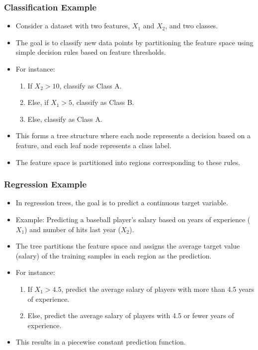 \documentclass{article}
\begin{document}
\subsubsection{Classification Example}

\begin{itemize}
    \item Consider a dataset with two features, $X_1$ and $X_2$, and two classes.
    \item The goal is to classify new data points by partitioning the feature space using simple decision rules based on feature thresholds.
    \item For instance:
    \begin{enumerate}
        \item If $X_2 > 10$, classify as Class A.
        \item Else, if $X_1 > 5$, classify as Class B.
        \item Else, classify as Class A.
    \end{enumerate}
    \item This forms a tree structure where each node represents a decision based on a feature, and each leaf node represents a class label.
    \item The feature space is partitioned into regions corresponding to these rules.
\end{itemize}

\subsubsection{Regression Example}

\begin{itemize}
    \item In regression trees, the goal is to predict a continuous target variable.
    \item Example: Predicting a baseball player's salary based on years of experience ($X_1$) and number of hits last year ($X_2$).
    \item The tree partitions the feature space and assigns the average target value (salary) of the training samples in each region as the prediction.
    \item For instance:
    \begin{enumerate}
        \item If $X_1 > 4.5$, predict the average salary of players with more than 4.5 years of experience.
        \item Else, predict the average salary of players with 4.5 or fewer years of experience.
    \end{enumerate}
    \item This results in a piecewise constant prediction function.
\end{itemize}
\end{document}
